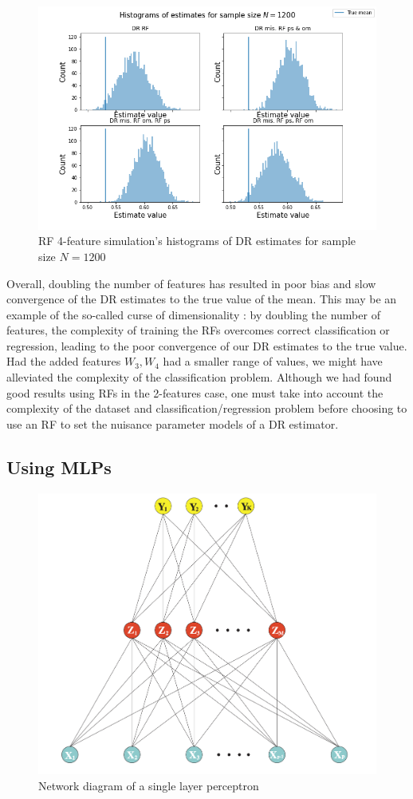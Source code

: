 \documentclass[12pt,twoside]{article}
\begin{document}
\begin{figure}[h!]
    \centering
    \includegraphics[width = 0.9\columnwidth]{figures/histRF_moreW.png}
    \caption{RF 4-feature simulation's histograms of DR estimates for sample size $N = 1200$}
    \label{fighistRF_moreW}
\end{figure}

Overall, doubling the number of features has resulted in poor bias and slow convergence of the DR estimates to the true value of the mean. This may be an example of the so-called curse of dimensionality \citep{Wasserman2006}: by doubling the number of features, the complexity of training the RFs overcomes correct classification or regression, leading to the poor convergence of our DR estimates to the true value. Had the added features $W_3, W_4$ had a smaller range of values, we might have alleviated the complexity of the classification problem. Although we had found good results using RFs in the 2-features case, one must take into account the complexity of the dataset and classification/regression problem before choosing to use an RF to set the nuisance parameter models of a DR estimator.

\clearpage
\subsection{Using MLPs}
\begin{figure}[h!]
    \centering
    \includegraphics[width = 0.7\columnwidth]{figures/Screenshot 2021-05-26 at 19.21.43.png}
    \caption{Network diagram of a single layer perceptron \citep{hastieESL}}
    \label{fignn}
\end{figure}
\end{document}
